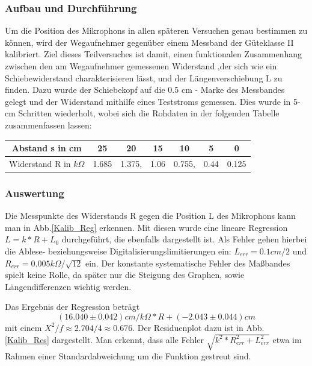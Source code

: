 \documentclass[]{article}
\begin{document}
	\subsubsection{Aufbau und Durchführung}

	Um die Position des Mikrophons in allen späteren Versuchen genau bestimmen zu können, wird der Wegaufnehmer gegenüber einem Messband der Güteklasse II kalibriert. Ziel dieses Teilversuches ist damit, einen funktionalen Zusammenhang zwischen den am Wegaufnehmer gemessenen Widerstand ,der sich wie ein Schiebewiderstand charakterisieren lässt, und der Längenverschiebung L zu finden. Dazu wurde der Schiebekopf auf die 0.5 cm - Marke des Messbandes gelegt und der Widerstand mithilfe eines Teststroms gemessen. Dies wurde in 5-cm Schritten wiederholt, wobei sich die Rohdaten in der folgenden Tabelle zusammenfassen lassen:

	\begin{center}
	\begin{tabular}{|c|c|c|c|c|c|c|}
		\hline 
		Abstand s in cm & 25 & 20 & 15 & 10 & 5 & 0 \\ 
		\hline 
		Widerstand R in $k\Omega$ & 1.685 & 1.375, & 1.06 & 0.755, & 0.44 & 0.125 \\ 
		\hline 
	\end{tabular} 
	\end{center}

	\subsubsection{Auswertung}

	Die Messpunkte des Widerstands R gegen die Position L des Mikrophons kann man in Abb.\ref{Kalib_Reg} erkennen. Mit diesen wurde eine lineare Regression $L=k*R+L_0$ durchgeführt, die ebenfalls dargestellt ist. Als Fehler gehen hierbei die Ablese- beziehungsweise Digitalisierungslimitierungen ein: $L_{err}=0.1cm/2$ und $R_{err}=0.005k\Omega/\sqrt{12}$ ein. Der konstante systematische Fehler des Maßbandes spielt keine Rolle, da später nur die Steigung des Graphen, sowie Längendifferenzen wichtig werden.      

	Das Ergebnis der Regression beträgt 
	\begin{equation}
		(16.040\pm0.042)cm/k\Omega*R+(-2.043\pm0.044)cm
		\label{Kalib}
	\end{equation}
	mit einem $X^2/f \approx 2.704/4 \approx 0.676$. Der Residuenplot dazu ist in Abb.\ref{Kalib_Res} dargestellt. Man erkennt, dass alle Fehler $\sqrt{k^2*R_{err}^2+L_{err}^2}$ etwa im Rahmen einer Standardabweichung um die Funktion gestreut sind.\\   
\end{document}
